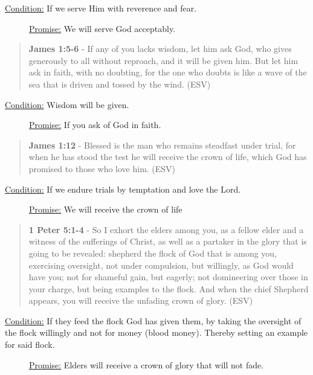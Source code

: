 \documentclass[11pt]{article}
\begin{document}
\begin{description}
\item[{\uline{Condition:} If we serve Him with reverence and fear.}] \uline{Promise:} We will serve God acceptably.
\end{description}

\begin{quote}
\textbf{James 1:5-6} - If any of you lacks wisdom, let him ask God, who gives generously to all without reproach, and it will be given him. But let him ask in faith, with no doubting, for the one who doubts is like a wave of the sea that is driven and tossed by the wind. (ESV)
\end{quote}

\begin{description}
\item[{\uline{Condition:} Wisdom will be given.}] \uline{Promise:} If you ask of God in faith.
\end{description}

\begin{quote}
\textbf{James 1:12} - Blessed is the man who remains steadfast under trial, for when he has stood the test he will receive the crown of life, which God has promised to those who love him. (ESV)
\end{quote}

\begin{description}
\item[{\uline{Condition:} If we endure trials by temptation and love the Lord.}] \uline{Promise:} We will receive the crown of life
\end{description}

\begin{quote}
\textbf{1 Peter 5:1-4} - So I exhort the elders among you, as a fellow elder and a witness of the sufferings of Christ, as well as a partaker in the glory that is going to be revealed: shepherd the flock of God that is among you, exercising oversight, not under compulsion, but willingly, as God would have you; not for shameful gain, but eagerly; not domineering over those in your charge, but being examples to the flock. And when the chief Shepherd appears, you will receive the unfading crown of glory. (ESV)
\end{quote}

\begin{description}
\item[{\uline{Condition:} If they feed the flock God has given them, by taking the oversight of the flock willingly and not for money (blood money). Thereby setting an example for said flock.}] \uline{Promise:} Elders will receive a crown of glory that will not fade.
\end{description}
\end{document}

